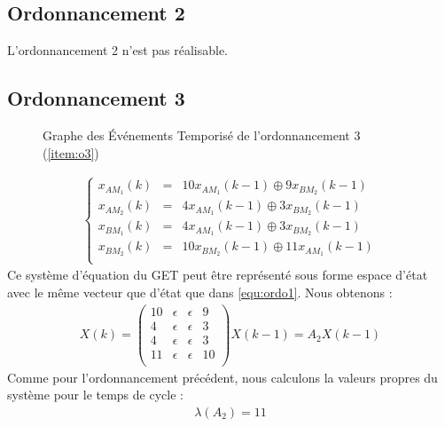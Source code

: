 \subsection{Ordonnancement 2}
L'ordonnancement 2 n'est pas réalisable.
\subsection{Ordonnancement 3}
\begin{figure}[!ht]
\centering
\caption{\label{fig:get} Graphe des Événements Temporisé de l'ordonnancement 3 (\ref{item:o3})}
\end{figure}
\begin{align*}%
\left\lbrace
\begin{array}{lcl}
x_{AM_1}(k)&=& 10x_{AM_1}(k-1) \oplus  9x_{BM_2}(k-1)\\
x_{AM_2}(k)&=&  4x_{AM_1}(k-1) \oplus  3x_{BM_2}(k-1)\\
x_{BM_1}(k)&=&  4x_{AM_1}(k-1) \oplus  3x_{BM_2}(k-1)\\
x_{BM_2}(k)&=& 10x_{BM_2}(k-1) \oplus 11x_{AM_1}(k-1)\\
\end{array}
\right.
\end{align*}
Ce système d'équation du GET peut être représenté sous forme espace d'état avec le même vecteur que d'état que dans \ref{equ:ordo1}. Nous obtenons :
\begin{align}\label{eqn:eeOrdo3}
X(k) = \begin{pmatrix}
10 & \epsilon &\epsilon & 9\\
4 &\epsilon &\epsilon & 3\\
4 &\epsilon &\epsilon & 3\\
11 &\epsilon &\epsilon & 10\\
\end{pmatrix}X(k-1) = A_2X(k-1)
\end{align} 
Comme pour l'ordonnancement précédent, nous calculons la valeurs propres du système pour le temps de cycle : 
\begin{eqnarray*}
\lambda(A_2) = 11  
\end{eqnarray*}

